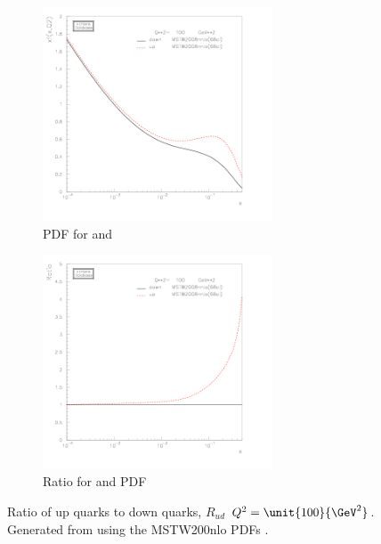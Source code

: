 \begin{figure}[htbp]
  \centering
  \begin{subfigure}{\textwidth}
    \centering
    \includegraphics[width=0.75\textwidth]{plot_pdf}
    \caption{PDF for \Pup and \Pdown}
    \label{fig:plot_pdf}
  \end{subfigure}
  \begin{subfigure}{\textwidth}
    \centering
    \includegraphics[width=0.75\textwidth]{plot_pdf_ratio}
    \caption{Ratio for \Pup and \Pdown PDF}
    \label{fig:plot_pdf_ratio}
  \end{subfigure}
  \caption{Ratio of up quarks to down quarks, $R_{ud}$ $ Q^2=\unit{100}{\GeV^2}$.
           Generated from \cite{hepdata} using the MSTW200nlo PDFs \cite{martin2009parton}.}
  \label{fig:w_process} 
\end{figure}

